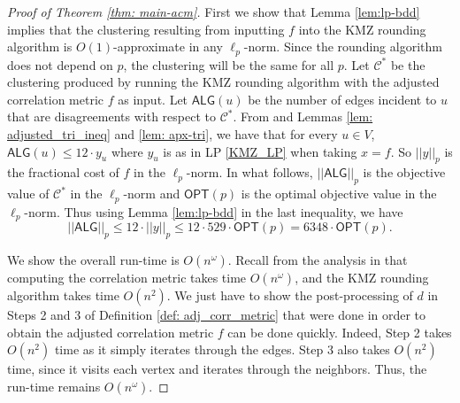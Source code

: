 \begin{proof}[Proof of Theorem \ref{thm: main-acm}]
First we show that Lemma \ref{lem:lp-bdd} implies that the clustering resulting from inputting $f$ into the KMZ rounding algorithm is $O(1)$-approximate in any $\ell_p$-norm. Since the rounding algorithm does not depend on $p$, the clustering will be the same for all $p$. 
Let $\mathcal{C^*}$ be the clustering produced by running the KMZ rounding algorithm with the adjusted correlation metric $f$ as input. Let $\textsf{ALG}(u)$ be the number of edges incident to $u$ that are disagreements with respect to $\mathcal{C}^*$. From \cite{KMZ19} and Lemmas \ref{lem: adjusted_tri_ineq} and \ref{lem: apx-tri}, we have that for every $u \in V$,
$\textsf{ALG}(u) \leq 12 \cdot y_u$
where $y_u$ is as in LP \ref{KMZ_LP} when taking $x=f$. 
So $||y||_p$ is the fractional cost of $f$ in the $\ell_p$-norm. 
In what follows, $||\textsf{ALG}||_p$ is the objective value of $\mathcal{C}^*$ in the $\ell_p$-norm and $\textsf{OPT}(p)$ is the optimal objective value in the $\ell_p$-norm. 
Thus using Lemma \ref{lem:lp-bdd} in the last inequality, we have 
\[||\textsf{ALG}||_p \leq 12 \cdot ||y||_p \leq 12 \cdot 529 \cdot \textsf{OPT}(p) = 6348 \cdot \textsf{OPT}(p).\]


We show the overall run-time is $O(n^\omega)$. Recall from the analysis in \cite{DMN23} that computing the correlation metric takes time $O(n^\omega)$, and the KMZ rounding algorithm takes time $O(n^2)$. We just have to show the post-processing of $d$ in Steps 2 and 3 of Definition \ref{def: adj_corr_metric} that were done in order to obtain the adjusted correlation metric $f$ can be done quickly. Indeed, Step 2 takes $O(n^2)$ time as it simply iterates through the edges. Step 3 also takes $O(n^2)$ time, since it visits each vertex and iterates through the neighbors. Thus, the run-time remains $O(n^\omega)$. 
\end{proof}


